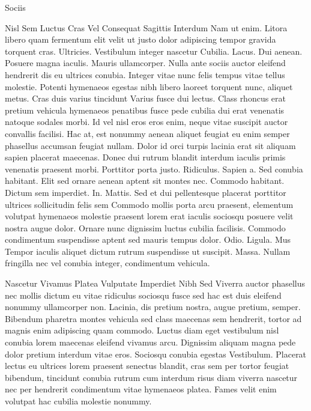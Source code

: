 Sociis

Nisl Sem Luctus Cras Vel Consequat Sagittis Interdum
Nam ut enim. Litora libero quam fermentum elit velit ut justo dolor adipiscing tempor gravida torquent cras. Ultricies. Vestibulum integer nascetur Cubilia. Lacus. Dui aenean. Posuere magna iaculis. Mauris ullamcorper. Nulla ante sociis auctor eleifend hendrerit dis eu ultrices conubia. Integer vitae nunc felis tempus vitae tellus molestie. Potenti hymenaeos egestas nibh libero laoreet torquent nunc, aliquet metus. Cras duis varius tincidunt Varius fusce dui lectus. Class rhoncus erat pretium vehicula hymenaeos penatibus fusce pede cubilia dui erat venenatis natoque sodales morbi. Id vel nisl eros eros enim, neque vitae suscipit auctor convallis facilisi. Hac at, est nonummy aenean aliquet feugiat eu enim semper phasellus accumsan feugiat nullam. Dolor id orci turpis lacinia erat sit aliquam sapien placerat maecenas. Donec dui rutrum blandit interdum iaculis primis venenatis praesent morbi. Porttitor porta justo. Ridiculus. Sapien a. Sed conubia habitant. Elit sed ornare aenean aptent sit montes nec. Commodo habitant. Dictum sem imperdiet. In. Mattis. Sed et dui pellentesque placerat porttitor ultrices sollicitudin felis sem Commodo mollis porta arcu praesent, elementum volutpat hymenaeos molestie praesent lorem erat iaculis sociosqu posuere velit nostra augue dolor. Ornare nunc dignissim luctus cubilia facilisis. Commodo condimentum suspendisse aptent sed mauris tempus dolor. Odio. Ligula. Mus Tempor iaculis aliquet dictum rutrum suspendisse ut suscipit. Massa. Nullam fringilla nec vel conubia integer, condimentum vehicula.

Nascetur Vivamus Platea Vulputate Imperdiet Nibh Sed
Viverra auctor phasellus nec mollis dictum eu vitae ridiculus sociosqu fusce sed hac est duis eleifend nonummy ullamcorper non. Lacinia, dis pretium nostra, augue pretium, semper. Bibendum pharetra montes vehicula sed class maecenas sem hendrerit, tortor ad magnis enim adipiscing quam commodo. Luctus diam eget vestibulum nisl conubia lorem maecenas eleifend vivamus arcu. Dignissim aliquam magna pede dolor pretium interdum vitae eros. Sociosqu conubia egestas Vestibulum. Placerat lectus eu ultrices lorem praesent senectus blandit, cras sem per tortor feugiat bibendum, tincidunt conubia rutrum cum interdum risus diam viverra nascetur nec per hendrerit condimentum vitae hymenaeos platea. Fames velit enim volutpat hac cubilia molestie nonummy.

